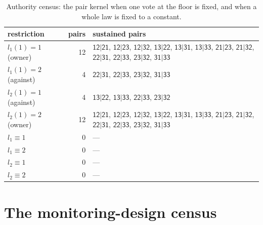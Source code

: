 \documentclass[11pt,a4paper]{article}
\theoremstyle{plain}
\theoremstyle{definition}
\theoremstyle{remark}
\newcommand{\st}[1]{\mathsf{#1}}
\begin{document}
\begin{table}[H]
\centering\footnotesize
\caption{Authority census: the pair kernel when one vote at the floor is fixed, and when a whole law is fixed to a constant.}
\label{tab:authority}
\begin{tabular}{lrp{}}
\toprule
restriction & pairs & sustained pairs \\
\midrule
$l_1(1)=1$ (owner) & 12 & $\st{12|21}$, $\st{12|23}$, $\st{12|32}$, $\st{13|22}$, $\st{13|31}$, $\st{13|33}$, $\st{21|23}$, $\st{21|32}$, $\st{22|31}$, $\st{22|33}$, $\st{23|32}$, $\st{31|33}$ \\
$l_1(1)=2$ (against) & 4 & $\st{22|31}$, $\st{22|33}$, $\st{23|32}$, $\st{31|33}$ \\
$l_2(1)=1$ (against) & 4 & $\st{13|22}$, $\st{13|33}$, $\st{22|33}$, $\st{23|32}$ \\
$l_2(1)=2$ (owner) & 12 & $\st{12|21}$, $\st{12|23}$, $\st{12|32}$, $\st{13|22}$, $\st{13|31}$, $\st{13|33}$, $\st{21|23}$, $\st{21|32}$, $\st{22|31}$, $\st{22|33}$, $\st{23|32}$, $\st{31|33}$ \\
$l_1\equiv 1$ & 0 & --- \\
$l_1\equiv 2$ & 0 & --- \\
$l_2\equiv 1$ & 0 & --- \\
$l_2\equiv 2$ & 0 & --- \\
\bottomrule
\end{tabular}
\end{table}
\section{The monitoring-design census}\label{si:design}
\end{document}
